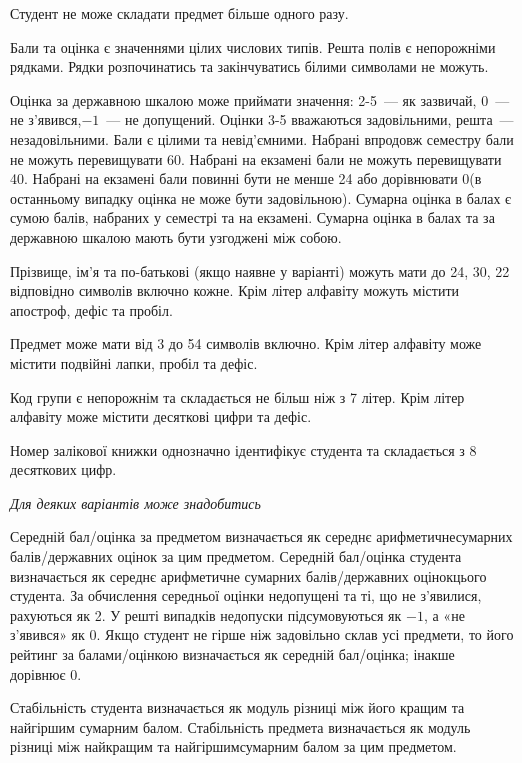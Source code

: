 \documentclass[11pt, ukrainian]{article}
\begin{document}
Студент не може складати предмет більше одного разу.

Бали та оцінка є значеннями цілих числових типів. Решта полів є непорожніми рядками.
Рядки розпочинатись та закінчуватись білими символами не можуть.

Оцінка за державною шкалою може приймати значення: 2-5~--- як зазвичай, 0~--- не з’явився,$-1$~--- не допущений. 
Оцінки 3-5 вважаються задовільними, решта~--- незадовільними. 
Бали є цілими та невід’ємними.
Набрані впродовж семестру бали не можуть перевищувати 60. 
Набрані на екзамені бали не можуть перевищувати 40. 
Набрані на екзамені бали повинні бути не менше 24 або дорівнювати 0(в останньому випадку оцінка не може бути задовільною). 
Сумарна оцінка в балах є сумою балів, набраних у семестрі та на екзамені.
Сумарна оцінка в балах та за державною шкалою мають бути узгоджені між собою.

Прізвище, ім’я та по-батькові (якщо наявне у варіанті) можуть мати до 24, 30, 22 відповідно символів включно кожне. 
Крім літер алфавіту можуть містити апостроф, дефіс та пробіл.

Предмет може мати від 3 до 54 символів включно. 
Крім літер алфавіту може містити подвійні лапки, пробіл та дефіс.

Код групи є непорожнім та складається не більш ніж з 7 літер. 
Крім літер алфавіту може містити десяткові цифри та дефіс.


Номер залікової книжки однозначно ідентифікує студента та складається з 8 десяткових цифр. 

\bigskip\textit{Для деяких варіантів може знадобитись}

Середній бал/оцінка за предметом визначається як середнє арифметичнесумарних балів/державних оцінок за цим предметом. 
Середній бал/оцінка студента визначається як середнє арифметичне сумарних балів/державних оцінокцього студента. 
За обчислення середньої оцінки недопущені та ті, що не з’явилися, рахуються як 2.
У решті випадків недопуски підсумовуються як $-1$, а «не з’явився» як 0.
Якщо студент не гірше ніж задовільно склав усі предмети, 
то його рейтинг за балами/оцінкою визначається як середній бал/оцінка; інакше дорівнює 0.

Стабільність студента визначається як модуль різниці між його кращим та найгіршим сумарним балом.
Стабільність предмета визначається як модуль різниці між найкращим та найгіршимсумарним балом за цим предметом.
\end{document}
